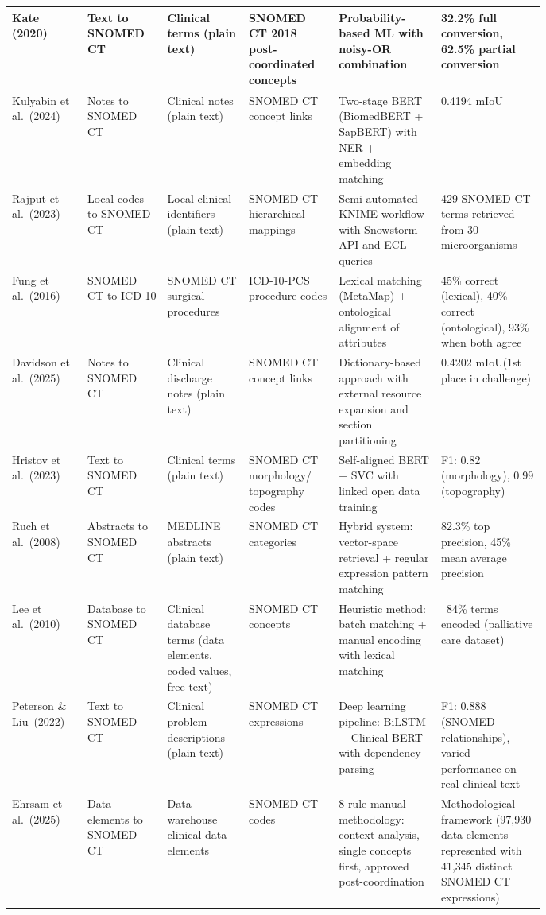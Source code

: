 \begin{longtable}{|L{0.11\linewidth}|L{0.11\linewidth}|L{0.12\linewidth}|L{0.12\linewidth}|L{0.16\linewidth}|L{0.16\linewidth}|}
\hline
\endlastfoot
Kate (2020) \cite{Kate:2020} & Text to SNOMED CT & Clinical terms (plain text) & SNOMED CT 2018 post-coordinated concepts & Probability-based ML with noisy-OR combination & 32.2\% full conversion\footnotemark[1], 62.5\% partial conversion\footnotemark[2] \\
\hline
Kulyabin et al.~(2024) \cite{Kulyabin:2024} & Notes to SNOMED CT & Clinical notes (plain text) & SNOMED CT concept links & Two-stage BERT (BiomedBERT + SapBERT) with NER + embedding matching & 0.4194 mIoU\footnotemark[3] \\
\hline
Rajput et al.~(2023) \cite{Rajput:2023} & Local codes to SNOMED CT & Local clinical identifiers (plain text) & SNOMED CT hierarchical mappings & Semi-automated KNIME workflow with Snowstorm API and ECL queries & 429 SNOMED CT terms retrieved from 30 microorganisms \\
\hline
Fung et al.~(2016) \cite{Fung:2016} & SNOMED CT to ICD-10 & SNOMED CT surgical procedures & ICD-10-PCS procedure codes & Lexical matching (MetaMap) + ontological alignment of attributes & 45\% correct (lexical), 40\% correct (ontological), 93\% when both agree \\
\hline
Davidson et al.~(2025) \cite{Davidson:2025} & Notes to SNOMED CT & Clinical discharge notes (plain text) & SNOMED CT concept links & Dictionary-based approach with external resource expansion and section partitioning & 0.4202 mIoU\footnotemark[3] (1st place in challenge) \\
\hline
Hristov et al.~(2023) \cite{Hristov:2023} & Text to SNOMED CT & Clinical terms (plain text) & SNOMED CT morphology/ topography codes & Self-aligned BERT + SVC with linked open data training & F1: 0.82 (morphology), 0.99 (topography) \\
\hline
Ruch et al.~(2008) \cite{Ruch:2008} & Abstracts to SNOMED CT & MEDLINE abstracts (plain text) & SNOMED CT categories & Hybrid system: vector-space retrieval + regular expression pattern matching & 82.3\% top precision, 45\% mean average precision \\
\hline
Lee et al.~(2010) \cite{Lee:2010} & Database to SNOMED CT & Clinical database terms (data elements, coded values, free text) & SNOMED CT concepts & Heuristic method: batch matching + manual encoding with lexical matching & ~84\% terms encoded (palliative care dataset) \\
\hline
Peterson \& Liu~(2022) \cite{Peterson:2022} & Text to SNOMED CT & Clinical problem descriptions (plain text) & SNOMED CT expressions & Deep learning pipeline: BiLSTM + Clinical BERT with dependency parsing & F1: 0.888 (SNOMED relationships), varied performance on real clinical text \\
\hline
Ehrsam et al.~(2025) \cite{Ehrsam:2025} & Data elements to SNOMED CT & Data warehouse clinical data elements & SNOMED CT codes & 8-rule manual methodology: context analysis, single concepts first, approved post-coordination & Methodological framework (97,930 data elements represented with 41,345 distinct SNOMED CT expressions) \\ \hline


\end{longtable}
